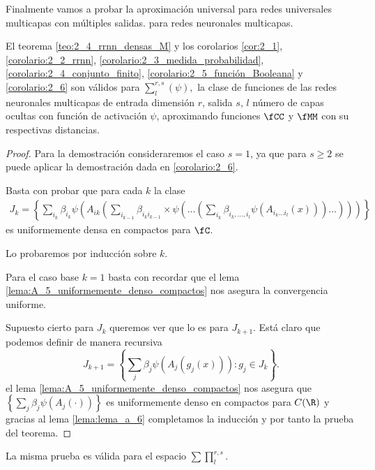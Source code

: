 Finalmente vamos a probar la aproximación universal para redes universales multicapas con múltiples salidas. 
para redes neuronales multicapas. 
\begin{corolario}
    El teorema
    \ref{teo:2_4_rrnn_densas_M} 
    y los corolarios
    \ref{cor:2_1}, 
    \ref{corolario:2_2_rrnn},
    \ref{corolario:2_3_medida_probabilidad},
    \ref{corolario:2_4_conjunto_finito},
    \ref{corolario:2_5_función_Booleana}
    y 
    \ref{corolario:2_6}
    son válidos para $\sum_{l}^{r,s}(\psi),$
    la clase de funciones de las redes neuronales multicapas de entrada 
    dimensión $r$, salida $s$, $l$ número de capas ocultas con función de
    activación $\psi$, aproximando funciones $\fCC$ y $\fMM$ con su respectivas distancias. 
\end{corolario}
\begin{proof}
    Para la demostración consideraremos el caso $s=1$, ya que para $s\geq 2$ 
    se puede aplicar la demostración dada en \ref{corolario:2_6}.

    Basta con probar que para cada $k$ la clase 
    \begin{align}
        J_k = \left\{
            \sum_{i_k} \beta_{ i_k} \psi
            \left(
                A_{i k}
                \left(
                    \sum_{i_{k-1}} \beta_{ i_k i_{k-1}} 
                    \times
                    \psi \left(
                         \ldots 
                         \left(
                            \sum_{i_k} \beta_{ i_k, \ldots, i_l} 
                            \psi(A_{i_k \ldots i_l}(x))
                         \right)
                         \ldots
                    \right)
                \right)
            \right)
        \right\}
    \end{align}
    es uniformemente densa en compactos para $\fC$.

    Lo probaremos por inducción sobre $k$.

    Para el caso base $k=1$ basta con recordar que el lema \ref{lema:A_5_uniformemente_denso_compactos} 
    nos asegura la convergencia uniforme.

    Supuesto cierto para $J_k$ queremos ver que lo es para $J_{k+1}$. 
    Está claro que podemos definir de manera recursiva
    \begin{equation}
        J_{k+1} = \left\{
            \sum_j \beta_j \psi(A_j(g_j(x)))
            : g_j \in J_k
        \right\}.
    \end{equation}
    el lema \ref{lema:A_5_uniformemente_denso_compactos} nos asegura que 
    $\left\{
        \sum_j \beta_j \psi(A_j(\cdot))
    \right\}$ es uniformemente denso en compactos para $C(\R)$ y gracias al lema \ref{lema:lema_a_6} completamos la inducción y por tanto la prueba del teorema. 
\end{proof}
La misma prueba es válida para el espacio $\sum \prod_l ^{r,s}$.